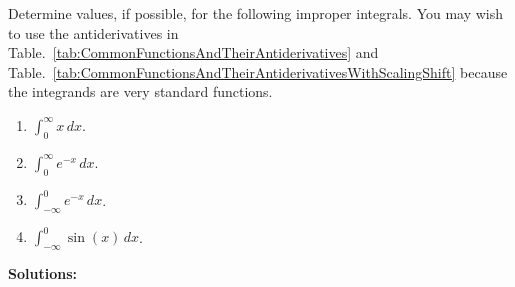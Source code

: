\begin{example} 
\label{ex:SingleSidedImproperIntegrals}
Determine values, if possible, for the following improper integrals. You may wish to use the antiderivatives in Table.~\ref{tab:CommonFunctionsAndTheirAntiderivatives} and Table.~\ref{tab:CommonFunctionsAndTheirAntiderivativesWithScalingShift} because the integrands are very standard functions.
 \begin{enumerate}
\renewcommand{\labelenumi}{(\alph{enumi})}
\setlength{\itemsep}{.2cm}
    \item $\int_0 ^\infty x \, dx$.

    \item $\int_0 ^\infty e^{-x} \, dx$.

    
    \item $\int_{-\infty}^0 e^{-x} \, dx$.

    \item $\int_{-\infty} ^0 \sin(x) \, dx$.

\end{enumerate}
    
\end{example}

\textbf{Solutions:} 

